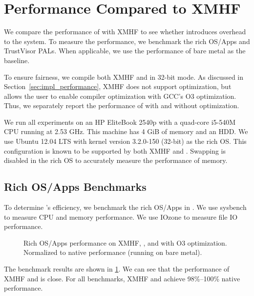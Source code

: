 \section{Performance Compared to XMHF}
\label{sec:evaluation_perf_xmhf}

We compare the performance of  with XMHF to see whether  introduces overhead to the system. To measure the performance, we benchmark the rich OS/Apps and TrustVisor PALs. When applicable, we use the performance of bare metal as the baseline.

To ensure fairness, we compile both XMHF and  in 32-bit mode. As discussed in Section~\ref{sec:impl_performance}, XMHF does not support optimization, but  allows the user to enable compiler optimization with GCC's O3 optimization. Thus, we separately report the performance of  with and without optimization.

We run all experiments on an HP EliteBook 2540p with a quad-core i5-540M CPU running at 2.53 GHz. This machine has 4 GiB of memory and an HDD. We use Ubuntu 12.04 LTS with kernel version 3.2.0-150 (32-bit) as the rich OS. This configuration is known to be supported by both XMHF and . Swapping is disabled in the rich OS to accurately measure the performance of memory.

\subsection{Rich OS/Apps Benchmarks}
\label{sec:evaluation_perf_xmhf_os}

To determine 's efficiency, we benchmark the rich OS/Apps in . We use sysbench \cite{kopytov2020sysbench} to measure CPU and memory performance. We use IOzone \cite{norcott2003iozone} to measure file IO performance.

\begin{figure}[tbp]
	\begin{center}
	
	\end{center}
	\caption[Rich OS/Apps performance on XMHF, , and  with O3 optimization, normalized to native performance.]{Rich OS/Apps performance on XMHF, , and  with O3 optimization. Normalized to native performance (running on bare metal).}
	\label{fig:sysbench_ubuntu}
\end{figure}

The benchmark results are shown in \ref{fig:sysbench_ubuntu}. We can see that the performance of XMHF and  is close. For all benchmarks, XMHF and  achieve 98\%--100\% native performance.

